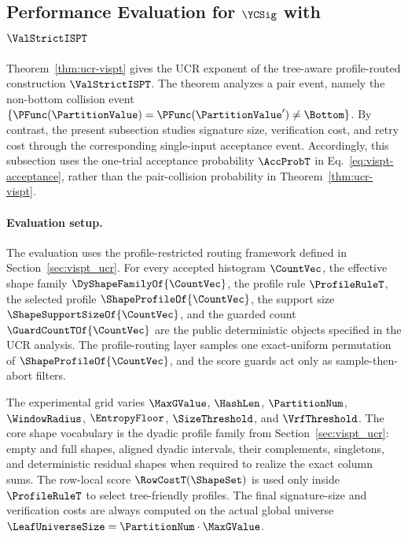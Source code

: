 \subsection{Performance Evaluation for $\YCSig$ with $\ValStrictISPT$}
\label{sec:vispt_performance}

Theorem~\ref{thm:ucr-vispt} gives the UCR exponent of the tree-aware
profile-routed construction $\ValStrictISPT$. The theorem analyzes a pair
event, namely the non-bottom collision event
$\{\PFunc(\PartitionValue)=\PFunc(\PartitionValue')\neq\Bottom\}$. By contrast,
the present subsection studies signature size, verification cost, and retry
cost through the corresponding single-input acceptance event. Accordingly, this
subsection uses the one-trial acceptance probability $\AccProbT$ in
Eq.~\eqref{eq:vispt-acceptance}, rather than the pair-collision probability in
Theorem~\ref{thm:ucr-vispt}.

\paragraph{Evaluation setup.}
The evaluation uses the profile-restricted routing framework defined in
Section~\ref{sec:vispt_ucr}. For every accepted histogram $\CountVec$, the
effective shape family $\DyShapeFamilyOf{\CountVec}$, the profile rule
$\ProfileRuleT$, the selected profile $\ShapeProfileOf{\CountVec}$, the support
size $\ShapeSupportSizeOf{\CountVec}$, and the guarded count
$\GuardCountTOf{\CountVec}$ are the public deterministic objects specified in
the UCR analysis. The profile-routing layer samples one exact-uniform
permutation of $\ShapeProfileOf{\CountVec}$, and the score guards act only as
sample-then-abort filters.

The experimental grid varies $\MaxGValue$, $\HashLen$, $\PartitionNum$,
$\WindowRadius$, $\EntropyFloor$, $\SizeThreshold$, and $\VrfThreshold$. The
core shape vocabulary is the dyadic profile family from
Section~\ref{sec:vispt_ucr}: empty and full shapes, aligned dyadic intervals,
their complements, singletons, and deterministic residual shapes when required
to realize the exact column sums. The row-local score
$\RowCostT(\ShapeSet)$ is used only inside $\ProfileRuleT$ to select
tree-friendly profiles. The final signature-size and verification costs are
always computed on the actual global universe
$\LeafUniverseSize=\PartitionNum\cdot\MaxGValue$.

